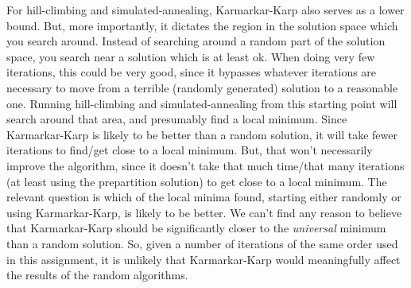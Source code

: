 \documentclass[12pt]{article}
\begin{document}
For hill-climbing and simulated-annealing, Karmarkar-Karp also serves as a lower bound. But, more importantly, it dictates the region in the solution space which you search around. Instead of searching around a random part of the solution space, you search near a solution which is at least ok.  When doing very few iterations, this could be very good, since it bypasses whatever iterations are necessary to move from a terrible (randomly generated) solution to a reasonable one. Running hill-climbing and simulated-annealing from this starting point will search around that area, and presumably find a local minimum. Since Karmarkar-Karp is likely to be better than a random solution, it will take fewer iterations to find/get close to a local minimum. But, that won't necessarily improve the algorithm, since it doesn't take that much time/that many iterations (at least using the prepartition solution) to get close to a local minimum. The relevant question is which of the local minima found, starting either randomly or using Karmarkar-Karp, is likely to be better. We can't find any reason to believe that Karmarkar-Karp should be significantly closer to the \emph{universal} minimum than a random solution. So, given a number of iterations of the same order used in this assignment, it is unlikely that Karmarkar-Karp would meaningfully affect the results of the random algorithms.

\end{document}
